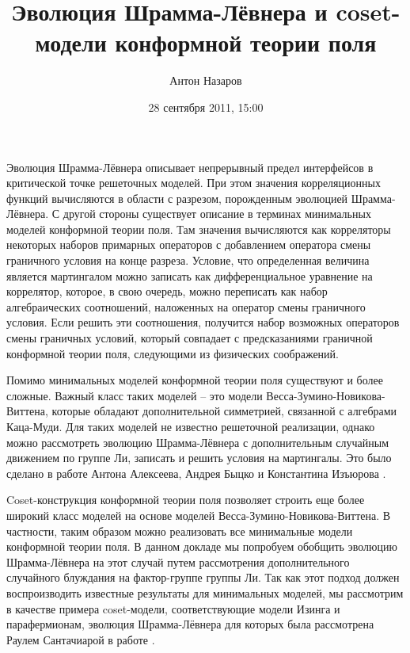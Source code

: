 \documentclass[a4paper,12pt]{article}
\author{Антон Назаров}
\title{Эволюция Шрамма-Лёвнера и coset-модели конформной теории поля}
\date{28 сентября 2011, 15:00}
\begin{document}
\pagestyle{empty}
\maketitle

  Эволюция Шрамма-Лёвнера описывает непрерывный предел интерфейсов в критической точке решеточных
  моделей. При этом значения корреляционных функций вычисляются в области с разрезом, порожденным
  эволюцией Шрамма-Лёвнера. С другой стороны существует описание в терминах минимальных моделей
  конформной теории поля. Там значения вычисляются как корреляторы некоторых наборов примарных
  операторов с добавлением оператора смены граничного условия на конце разреза. Условие, что
  определенная величина является мартингалом можно записать как дифференциальное уравнение на
  коррелятор, которое, в свою очередь, можно переписать как набор алгебраических соотношений,
  наложенных на оператор смены граничного условия. Если решить эти соотношения, получится набор
  возможных операторов смены граничных условий, который совпадает с предсказаниями граничной
  конформной теории поля, следующими из физических соображений.

  Помимо минимальных моделей конформной теории поля существуют и более сложные. Важный класс таких
  моделей -- это модели Весса-Зумино-Новикова-Виттена, которые обладают дополнительной симметрией,
  связанной с алгебрами Каца-Муди. Для таких моделей не известно решеточной реализации, однако можно
  рассмотреть эволюцию Шрамма-Лёвнера с дополнительным случайным движением по группе Ли, записать и
  решить условия на мартингалы. Это было сделано в работе Антона Алексеева, Андрея Быцко и
  Константина Изъюрова \cite{alekseev2010sle}. 

  Coset-конструкция конформной теории поля позволяет строить еще более широкий класс моделей на
  основе моделей Весса-Зумино-Новикова-Виттена. В частности, таким образом можно реализовать все
  минимальные модели конформной теории поля. В данном докладе мы попробуем обобщить эволюцию
  Шрамма-Лёвнера на этот случай путем рассмотрения дополнительного случайного блуждания на
  фактор-группе группы Ли. Так как этот подход должен воспроизводить известные результаты для
  минимальных моделей, мы рассмотрим в качестве примера coset-модели, соответствующие модели Изинга
  и парафермионам, эволюция Шрамма-Лёвнера для которых была рассмотрена Раулем Сантачиарой в работе
  \cite{santachiara2008sle}.


{}

\end{document}
